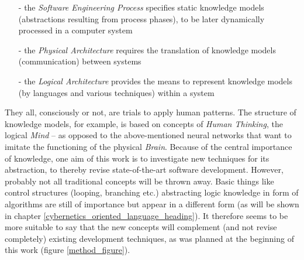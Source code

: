 \begin{itemize}
    \item[-] the \emph{Software Engineering Process} specifies static knowledge
        models (abstractions resulting from process phases), to be later
        dynamically processed in a computer system
    \item[-] the \emph{Physical Architecture} requires the translation of
        knowledge models (communication) between systems
    \item[-] the \emph{Logical Architecture} provides the means to represent
        knowledge models (by languages and various techniques) within a system
\end{itemize}

They all, consciously or not, are trials to apply human patterns. The structure
of knowledge models, for example, is based on concepts of \emph{Human Thinking},
the logical \emph{Mind} -- as opposed to the above-mentioned neural networks
that want to imitate the functioning of the physical \emph{Brain}. Because of
the central importance of knowledge, one aim of this work is to investigate new
techniques for its abstraction, to thereby revise state-of-the-art software
development. However, probably not all traditional concepts will be thrown
away. Basic things like control structures (looping, branching etc.)
abstracting logic knowledge in form of algorithms are still of importance but
appear in a different form (as will be shown in chapter
\ref{cybernetics_oriented_language_heading}). It therefore seems to be more
suitable to say that the new concepts will complement (and not revise
completely) existing development techniques, as was planned at the beginning of
this work (figure \ref{method_figure}).
